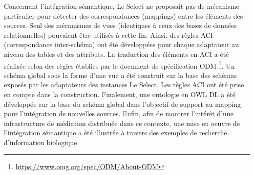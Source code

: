 Concernant l'intégration sémantique, Le Select ne proposait pas de mécanisme particulier pour détecter des correspondances (mappings) entre les éléments des sources. Seul des mécanismes de vues (identiques à ceux des bases de données relationnelles) pouvaient être utilisés à cette fin.  Ainsi, des règles ACI (correspondance inter-schéma) ont été développées pour chaque adaptateur au niveau des tables et des attributs. La traduction des éléments en ACI a été réalisée selon des règles établies par le document de spécification ODM  \footnote{\url{https://www.omg.org/spec/ODM/About-ODM}}. Un schéma global sous la forme d'une vue a été construit sur la base des schémas exposés par les adaptateurs des instances Le Select. Les règles ACI ont été prise en compte dans la construction. Finalement,  une ontologie en OWL DL a été développée sur la base du schéma global dans l'objectif de support au mapping pour l'intégration de nouvelles sources.  Enfin, afin de montrer l'intérêt d'une infrastructure de médiation distribuée dans ce contexte, une mise en oeuvre de l'intégration sémantique a été illustrée à travers des exemples de recherche d'information biologique. \\

